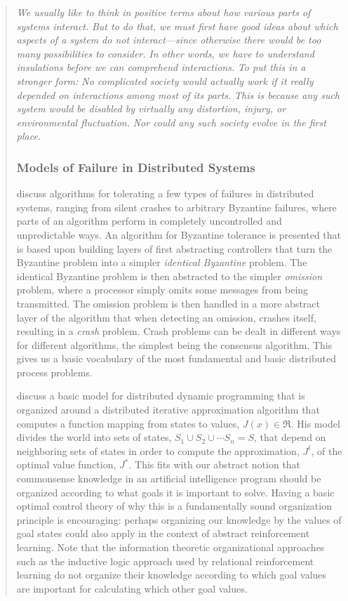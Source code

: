 \begin{quotation}
\emph{We usually like to think in positive terms about how various parts of systems interact.}
\emph{But to do that, we must first have good ideas about which aspects of a system do \emph{not} interact---since otherwise there would be too many possibilities to consider.}
\emph{In other words, we have to understand \emph{insulations} before we can comprehend interactions.}
\emph{To put this in a stronger form: \emph{No complicated society would actually work if it really depended on interactions among most of its parts}.}
\emph{This is because any such system would be disabled by virtually any distortion, injury, or environmental fluctuation.}
\emph{Nor could any such society evolve in the first place.}


\subsubsection{Models of Failure in Distributed Systems}

\cite{attiya2004dcf} discuss algorithms for tolerating a few types of failures in distributed systems, ranging from silent crashes to arbitrary Byzantine failures, where parts of an algorithm perform in completely uncontrolled and unpredictable ways.
An algorithm for Byzantine tolerance is presented that is based upon building layers of first abstracting controllers that turn the Byzantine problem into a simpler \emph{identical Byzantine} problem.
The identical Byzantine problem is then abstracted to the simpler \emph{omission} problem, where a processor simply omits some messages from being transmitted.
The omission problem is then handled in a more abstract layer of the algorithm that when detecting an omission, crashes itself, resulting in a \emph{crash} problem.
Crash problems can be dealt in different ways for different algorithms, the simplest being the consensus algorithm.
This gives us a basic vocabulary of the most fundamental and basic distributed process problems.

\cite{1102980} discuss a basic model for distributed dynamic programming that is organized around a distributed iterative approximation algorithm that computes a function mapping from states to values, $J(x){\in}\Re$.
His model divides the world into sets of states, $S_1 \cup S_2 \cup \cdots S_n = S$, that depend on neighboring sets of states in order to compute the approximation, $J^t$, of the optimal value function, $J^*$.
This fits with our abstract notion that commonsense knowledge in an artificial intelligence program should be organized according to what goals it is important to solve.
Having a basic optimal control theory of why this is a fundamentally sound organization principle is encouraging: perhaps organizing our knowledge by the values of goal states could also apply in the context of abstract reinforcement learning.
Note that the information theoretic organizational approaches such as the inductive logic approach used by relational reinforcement learning do not organize their knowledge according to which goal values are important for calculating which other goal values.


\end{quotation}
